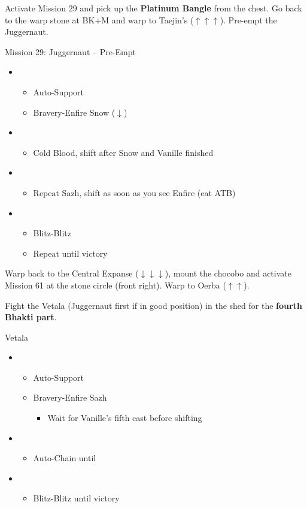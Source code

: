 Activate Mission 29 and pick up the \textbf{Platinum Bangle} from the chest.
Go back to the warp stone at BK+M and warp to Taejin's ($\uparrow\uparrow\uparrow$).
Pre-empt the Juggernaut.

\begin{battle}{Mission 29: Juggernaut -- Pre-Empt}
	\begin{itemize}
		\item \fourth
			\begin{itemize}
				\item Auto-Support
				\item Bravery-Enfire Snow ($\downarrow$)
			\end{itemize}
		\item \sixth
			\begin{itemize}
				\item Cold Blood, shift after Snow and Vanille finished
			\end{itemize}
		\item \fourth
			\begin{itemize}
				\item Repeat Sazh, shift as soon as you see Enfire (eat ATB)
			\end{itemize}
		\item \first
			\begin{itemize}
				\item Blitz-Blitz
				\item Repeat until victory
			\end{itemize}
	\end{itemize}
\end{battle}

Warp back to the Central Expanse ($\downarrow\downarrow\downarrow$), mount the chocobo and activate Mission 61 at the stone circle (front right).
Warp to Oerba ($\uparrow\uparrow$).

Fight the Vetala (Juggernaut first if in good position) in the shed for the \textbf{fourth Bhakti part}.

\begin{battle}{Vetala}
	\begin{itemize}
		\item \fourth
			\begin{itemize}
				\item Auto-Support
				\item Bravery-Enfire Sazh
					\begin{itemize}
						\item Wait for Vanille's fifth cast before shifting
					\end{itemize}
			\end{itemize}
		\item \sixth
			\begin{itemize}
				\item Auto-Chain until \stagger
			\end{itemize}
		\item \first
			\begin{itemize}
				\item Blitz-Blitz until victory
			\end{itemize}
	\end{itemize}
\end{battle}

